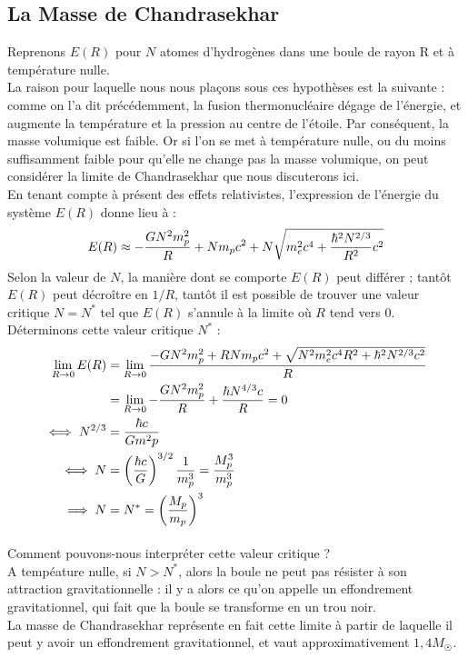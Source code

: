 \documentclass[../Notes de cours]{subfiles}
\begin{document}
\subsection{La Masse de Chandrasekhar}

Reprenons $E(R)$ pour $N$ atomes d'hydrogènes dans une boule de rayon R et à température nulle. \\
La raison pour laquelle nous nous plaçons sous ces hypothèses est la suivante : comme on l'a dit précédemment, la fusion thermonucléaire dégage de l'énergie, et augmente la température et la pression au centre de l'étoile. Par conséquent, la masse volumique est faible. Or si l'on se met à température nulle, ou du moins suffisamment faible pour qu'elle ne change pas la masse volumique, on peut considérer la limite de Chandrasekhar que nous discuterons ici. \\

En tenant compte à présent des effets relativistes, l'expression de l'énergie du système $E(R)$ donne lieu à : 
\begin{equation}
E(R) \approx - \frac{GN^2 m_p^2}{R} + N m_p c^2 + N \sqrt{m_e^2c^4 + \frac{\hbar^2N^{2/3}}{R^2}c^2} \\
\end{equation}
Selon la valeur de $N$, la manière dont se comporte $E(R)$ peut différer ; tantôt $E(R)$ peut décroître en $1/R$, tantôt il est possible de trouver une valeur critique $N = N^*$ tel que $E(R)$ s'annule à la limite où $R$ tend vers 0. Déterminons cette valeur critique $N^*$ : 
\begin{align}
\lim_{R\to 0} E(R) &= \lim_{R\to 0} \frac{-GN^2m^2_p + RNm_pc^2 + \sqrt{N^2m^2_ec^4R^2 + \hbar^2 N^{2/3} c^2}}{R} \notag \\
&= \lim_{R\to 0} - \frac{GN^2 m_p^2}{R} + \frac{\hbar N^{4/3} c}{R} = 0 \notag \\
\iff N^{2/3} &= \frac{\hbar c}{Gm^2p} \notag \\
\iff N &= \left( \frac{\hbar c}{G} \right)^{3/2} \frac{1}{m_p^3} = \frac{M_{p}^3}{m_p^3} \notag \\
\implies N &= N^* = \left( \frac{M_p}{m_p} \right)^3
\end{align}


\paragraph{} Comment pouvons-nous interpréter cette valeur critique ? \\
A tempéature nulle, si $N > N^*$, alors la boule ne peut pas résister à son attraction gravitationnelle : il y a alors ce qu'on appelle un effondrement gravitationnel, qui fait que la boule se transforme en un trou noir. \\
La masse de Chandrasekhar représente en fait cette limite à partir de laquelle il peut y avoir un effondrement gravitationnel, et vaut approximativement $1,4 M_{\astrosun}$. \\
\end{document}
